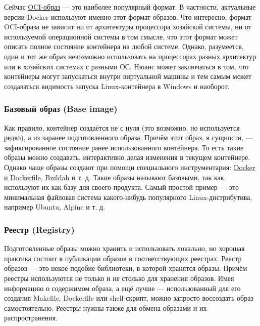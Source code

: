 \documentclass[14pt, a4paper]{article}
\begin{document}
Сейчас \href{https://github.com/opencontainers/image-spec}{OCI-образ} — это наиболее популярный формат. В частности, актуальные версии Docker
используют именно этот формат образов. Что интересно, формат OCI-образа не зависит ни от
архитектуры процессора хозяйской системы, ни от используемой операционной системы в том
смысле, что этот формат может описать полное состояние контейнера на любой системе. Однако,
разумеется, один и тот же образ невозможно использовать на процессорах разных архитектур или в
хозяйских системах с разными ОС. Нюанс может заключаться в том, что контейнеры могут
запускаться внутри виртуальной машины и тем самым может создаваться видимость запуска
Linux-контейнера в Windows и наоборот.\\


\subsubsection*{Базовый образ (Base image)}

Как правило, контейнер создаётся не с нуля (это возможно, но используется редко), а из заранее
подготовленного образа. Причём этот образ, в сущности, — зафиксированное состояние ранее
использованного контейнера. То есть такие образы можно создавать, интерактивно делая изменения
в текущем контейнере. Однако чаще образы создают при помощи специального инструментария:
\href{https://docs.docker.com/engine/reference/builder/}{Docker и Dockerfile}, \href{https://buildah.io/}{Buildah} и т. д. Такие образы называют базовыми, так как используют их как базу
для своего продукта. Самый простой пример — это минимальная файловая система какого-нибудь
популярного Linux-дистрибутива, например Ubuntu, Alpine и т. д.\\


\subsubsection*{Реестр (Registry)}

Подготовленные образы можно хранить и использовать локально, но хорошая практика состоит в
публикации образов в соответствующих реестрах. Реестр образов — это некое подобие библиотеки, в
которой хранятся образы. Причём реестры используются не только и не столько для хранения
образов. Имея информацию о содержимом образа, а ещё лучше — использованный для его создания
Makefile, Dockerfile или shell-скрипт, можно запросто воссоздать образ самостоятельно. Реестры
нужны также для обмена образами и их распространения.
\end{document}
